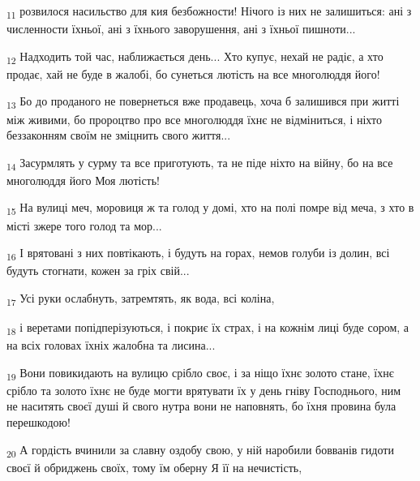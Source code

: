 \begin{tcolorbox}
\textsubscript{11} розвилося насильство для кия безбожности! Нічого із них не залишиться: ані з численности їхньої, ані з їхнього заворушення, ані з їхньої пишноти...
\end{tcolorbox}
\begin{tcolorbox}
\textsubscript{12} Надходить той час, наближається день... Хто купує, нехай не радіє, а хто продає, хай не буде в жалобі, бо сунеться лютість на все многолюддя його!
\end{tcolorbox}
\begin{tcolorbox}
\textsubscript{13} Бо до проданого не повернеться вже продавець, хоча б залишився при житті між живими, бо пророцтво про все многолюддя їхнє не відміниться, і ніхто беззаконням своїм не зміцнить свого життя...
\end{tcolorbox}
\begin{tcolorbox}
\textsubscript{14} Засурмлять у сурму та все приготують, та не піде ніхто на війну, бо на все многолюддя його Моя лютість!
\end{tcolorbox}
\begin{tcolorbox}
\textsubscript{15} На вулиці меч, моровиця ж та голод у домі, хто на полі помре від меча, з хто в місті зжере того голод та мор...
\end{tcolorbox}
\begin{tcolorbox}
\textsubscript{16} І врятовані з них повтікають, і будуть на горах, немов голуби із долин, всі будуть стогнати, кожен за гріх свій...
\end{tcolorbox}
\begin{tcolorbox}
\textsubscript{17} Усі руки ослабнуть, затремтять, як вода, всі коліна,
\end{tcolorbox}
\begin{tcolorbox}
\textsubscript{18} і веретами попідперізуються, і покриє їх страх, і на кожнім лиці буде сором, а на всіх головах їхніх жалобна та лисина...
\end{tcolorbox}
\begin{tcolorbox}
\textsubscript{19} Вони повикидають на вулицю срібло своє, і за ніщо їхнє золото стане, їхнє срібло та золото їхнє не буде могти врятувати їх у день гніву Господнього, ним не наситять своєї душі й свого нутра вони не наповнять, бо їхня провина була перешкодою!
\end{tcolorbox}
\begin{tcolorbox}
\textsubscript{20} А гордість вчинили за славну оздобу свою, у ній наробили бовванів гидоти своєї й обриджень своїх, тому їм оберну Я її на нечистість,
\end{tcolorbox}
